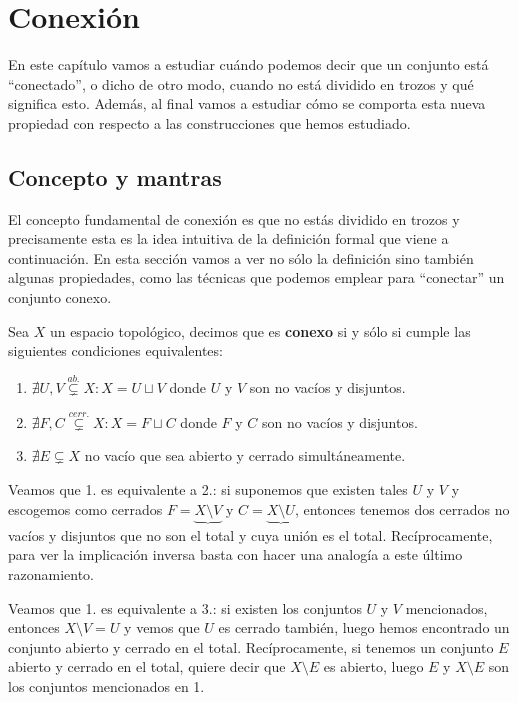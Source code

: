 \chapter{Conexión}%
\label{cha:conexion}
En este capítulo vamos a estudiar cuándo podemos decir que un conjunto está ``conectado'', o dicho de otro modo, cuando no está dividido en trozos y qué significa esto. Además, al final vamos a estudiar cómo se comporta esta nueva propiedad con respecto a las construcciones que hemos estudiado.

\section{Concepto y mantras}%
\label{sec:concepto_y_mantras_conx}
El concepto fundamental de conexión es que no estás dividido en trozos y precisamente esta es la idea intuitiva de la definición formal que viene a continuación. En esta sección vamos a ver no sólo la definición sino también algunas propiedades, como las técnicas que podemos emplear para ``conectar'' un conjunto conexo.

\begin{defi}[Conexión]
Sea $X$ un espacio topológico, decimos que es \textbf{conexo} si y sólo si cumple las siguientes condiciones equivalentes:
\begin{enumerate}
    \item $\nexists U,V \stackrel{ab.}{\subsetneq} X: X= U \sqcup V$ donde $U$ y $V$ son no vacíos y disjuntos.
    \item $\nexists F,C \stackrel{cerr.}{\subsetneq} X: X= F \sqcup C$ donde $F$ y $C$ son no vacíos y disjuntos.
    \item $\nexists E \subsetneq X$ no vacío que sea abierto y cerrado simultáneamente.
\end{enumerate}
\end{defi}
\begin{demo}
Veamos que 1. es equivalente a  2.: si suponemos que existen tales $U$ y $V$ y escogemos como cerrados $F = \underbrace{X \setminus V}$ y $C = \underbrace{X \setminus U}$, entonces tenemos dos cerrados no vacíos y disjuntos que no son el total y cuya unión es el total. Recíprocamente, para ver la implicación inversa basta con hacer una analogía a este último razonamiento.

Veamos que 1. es equivalente a 3.: si existen los conjuntos $U$ y $V$ mencionados, entonces $X\setminus V = U$ y vemos que $U$ es cerrado también, luego hemos encontrado un conjunto abierto y cerrado en el total. Recíprocamente, si tenemos un conjunto $E$ abierto y cerrado en el total, quiere decir que $X \setminus E$ es abierto, luego $E$ y $X\setminus E$ son los conjuntos mencionados en 1.
\end{demo}

